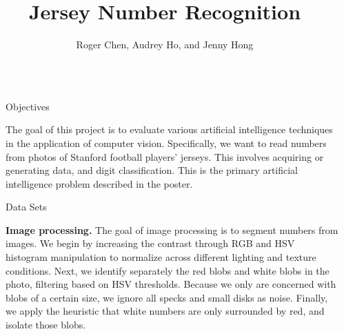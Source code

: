 \documentclass[final]{beamer}
\title{Jersey Number Recognition} %
\author{Roger Chen, Audrey Ho, and Jenny Hong} %
\institute{CS 221 Final Project} %
\newlength{\sepwid}
\newlength{\onecolwid}
\begin{document}

\setlength{\belowcaptionskip}{2ex} %
\setlength\belowdisplayshortskip{2ex} %

\begin{frame}[t] %

\begin{columns}[t] %

\begin{column}{\sepwid}\end{column} %

\begin{column}{\onecolwid} %


\begin{alertblock}{Objectives}

The goal of this project is to evaluate various artificial intelligence techniques in the application of computer vision. Specifically, we want to read numbers from photos of Stanford football players' jerseys. This involves acquiring or generating data, and digit classification. This is the primary artificial intelligence problem described in the poster.

\end{alertblock}


\begin{block}{Data Sets}

{\bf Image processing.} The goal of image processing is to segment numbers from images. We begin by increasing the contrast through RGB and HSV histogram manipulation to normalize across different lighting and texture conditions. Next, we identify separately the red blobs and white blobs in the photo, filtering based on HSV thresholds. Because we only are concerned with blobs of a certain size, we ignore all specks and small disks as noise. Finally, we apply the heuristic that white numbers are only surrounded by red, and isolate those blobs.


\end{block}
\end{column}
\end{columns}
\end{frame}
\end{document}

